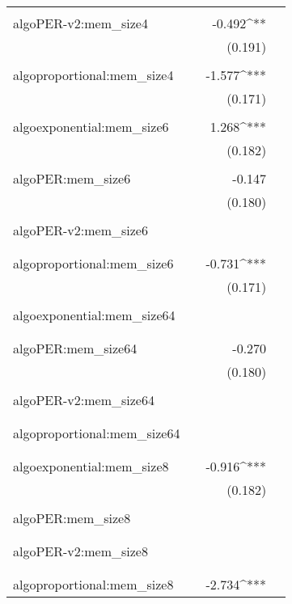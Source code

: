 \begin{table}[!htbp]
\begin{tabular}{@{\extracolsep{5pt}}lD{.}{.}{-3} D{.}{.}{-3} D{.}{.}{-3} }
  & & & \\ 
 algoPER-v2:mem\_size4 &  & -0.492^{**} &  \\ 
  &  & (0.191) &  \\ 
  & & & \\ 
 algoproportional:mem\_size4 &  & -1.577^{***} &  \\ 
  &  & (0.171) &  \\ 
  & & & \\ 
 algoexponential:mem\_size6 &  & 1.268^{***} &  \\ 
  &  & (0.182) &  \\ 
  & & & \\ 
 algoPER:mem\_size6 &  & -0.147 &  \\ 
  &  & (0.180) &  \\ 
  & & & \\ 
 algoPER-v2:mem\_size6 &  &  &  \\ 
  &  &  &  \\ 
  & & & \\ 
 algoproportional:mem\_size6 &  & -0.731^{***} &  \\ 
  &  & (0.171) &  \\ 
  & & & \\ 
 algoexponential:mem\_size64 &  &  &  \\ 
  &  &  &  \\ 
  & & & \\ 
 algoPER:mem\_size64 &  & -0.270 &  \\ 
  &  & (0.180) &  \\ 
  & & & \\ 
 algoPER-v2:mem\_size64 &  &  &  \\ 
  &  &  &  \\ 
  & & & \\ 
 algoproportional:mem\_size64 &  &  &  \\ 
  &  &  &  \\ 
  & & & \\ 
 algoexponential:mem\_size8 &  & -0.916^{***} &  \\ 
  &  & (0.182) &  \\ 
  & & & \\ 
 algoPER:mem\_size8 &  &  &  \\ 
  &  &  &  \\ 
  & & & \\ 
 algoPER-v2:mem\_size8 &  &  &  \\ 
  &  &  &  \\ 
  & & & \\ 
 algoproportional:mem\_size8 &  & -2.734^{***} &  \\ 

\end{tabular}
\end{table}
